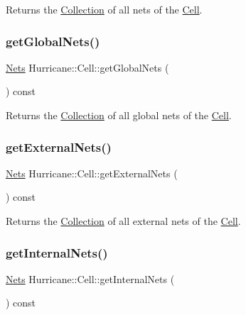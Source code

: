 Returns the \mbox{\hyperlink{classHurricane_1_1Collection}{Collection}} of all nets of the \mbox{\hyperlink{classHurricane_1_1Cell}{Cell}}. \mbox{\label{classHurricane_1_1Cell_a1512722d821edc18ff38e673862cd108}} 
\subsubsection{\texorpdfstring{get\+Global\+Nets()}{getGlobalNets()}}
{\footnotesize\ttfamily \mbox{\hyperlink{namespaceHurricane_a3404a8b17130a1824f4a281704b04df7}{Nets}} Hurricane\+::\+Cell\+::get\+Global\+Nets (\begin{DoxyParamCaption}{ }\end{DoxyParamCaption}) const}

Returns the \mbox{\hyperlink{classHurricane_1_1Collection}{Collection}} of all global nets of the \mbox{\hyperlink{classHurricane_1_1Cell}{Cell}}. \mbox{\label{classHurricane_1_1Cell_aa80f3345db8c1395fa04a50737208793}} 
\subsubsection{\texorpdfstring{get\+External\+Nets()}{getExternalNets()}}
{\footnotesize\ttfamily \mbox{\hyperlink{namespaceHurricane_a3404a8b17130a1824f4a281704b04df7}{Nets}} Hurricane\+::\+Cell\+::get\+External\+Nets (\begin{DoxyParamCaption}{ }\end{DoxyParamCaption}) const}

Returns the \mbox{\hyperlink{classHurricane_1_1Collection}{Collection}} of all external nets of the \mbox{\hyperlink{classHurricane_1_1Cell}{Cell}}. \mbox{\label{classHurricane_1_1Cell_a0da980d28ad60334da94a3966338f873}} 
\subsubsection{\texorpdfstring{get\+Internal\+Nets()}{getInternalNets()}}
{\footnotesize\ttfamily \mbox{\hyperlink{namespaceHurricane_a3404a8b17130a1824f4a281704b04df7}{Nets}} Hurricane\+::\+Cell\+::get\+Internal\+Nets (\begin{DoxyParamCaption}{ }\end{DoxyParamCaption}) const}

